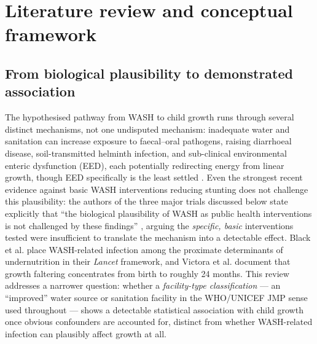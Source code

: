 
\section{Literature review and conceptual framework}\label{sec:2}

\subsection{From biological plausibility to demonstrated association}\label{sec:2.1}

The hypothesised pathway from WASH to child growth runs through several distinct mechanisms, not one undisputed mechanism: inadequate water and sanitation can increase exposure to faecal--oral pathogens, raising diarrhoeal disease, soil-transmitted helminth infection, and sub-clinical environmental enteric dysfunction (EED), each potentially redirecting energy from linear growth, though EED specifically is the least settled \autocite{CummingCairncross2016}. Even the strongest recent evidence against basic WASH interventions reducing stunting does not challenge this plausibility: the authors of the three major trials discussed below state explicitly that ``the biological plausibility of WASH as public health interventions is not challenged by these findings'' \autocite{Cumming2019}, arguing the \emph{specific, basic} interventions tested were insufficient to translate the mechanism into a detectable effect. Black et al. \autocite*{Black2013} place WASH-related infection among the proximate determinants of undernutrition in their \emph{Lancet} framework, and Victora et al. \autocite*{Victora2010} document that growth faltering concentrates from birth to roughly 24 months. This review addresses a narrower question: whether a \emph{facility-type classification} --- an ``improved'' water source or sanitation facility in the WHO/UNICEF JMP sense used throughout --- shows a detectable statistical association with child growth once obvious confounders are accounted for, distinct from whether WASH-related infection can plausibly affect growth at all.

